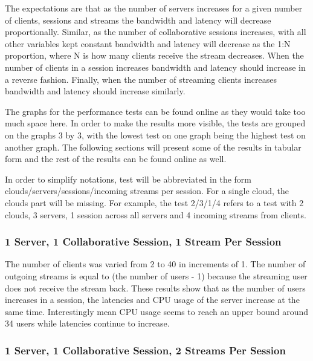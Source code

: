 The expectations are that as the number of servers increases for a given number of clients, sessions and streams the bandwidth and latency will decrease proportionally. Similar, as the number of collaborative sessions increases, with all other variables kept constant bandwidth and latency will decrease as the 1:N proportion, where N is how many clients receive the stream decreases. When the number of clients in a session increases bandwidth and latency should increase in a reverse fashion. Finally, when the number of streaming clients increases bandwidth and latency should increase similarly.

The graphs for the performance tests can be found online as they would take too much space here. In order to make the results more visible, the tests are grouped on the graphs 3 by 3, with the lowest test on one graph being the highest test on another graph. The following sections will present some of the results in tabular form and the rest of the results can be found online as well.

In order to simplify notations, test will be abbreviated in the form clouds/servers/sessions/incoming streams per session. For a single cloud, the clouds part will be missing. For example, the test 2/3/1/4 refers to a test with 2 clouds, 3 servers, 1 session across all servers and 4 incoming streams from clients.

\subsubsection{1 Server, 1 Collaborative Session, 1 Stream Per Session}
\label{sec:1serv_1sess_1str}

The number of clients was varied from 2 to 40 in increments of 1. The number of outgoing streams is equal to (the number of users - 1) because the streaming user does not receive the stream back. These results show that as the number of users increases in a session, the latencies and CPU usage of the server increase at the same time. Interestingly mean CPU usage seems to reach an upper bound around 34 users while latencies continue to increase.

\subsubsection{1 Server, 1 Collaborative Session, 2 Streams Per Session}
\label{sec:1serv_1sess_2str180}


